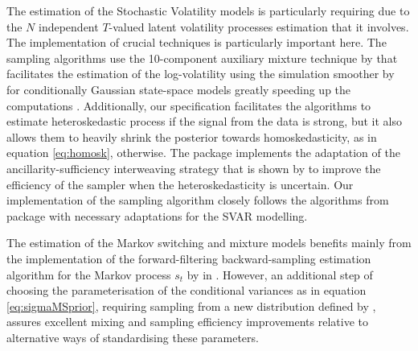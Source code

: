 \documentclass[
  nojss]{jss}
\begin{document}
The estimation of the Stochastic Volatility models is particularly
requiring due to the \(N\) independent \(T\)-valued latent volatility
processes estimation that it involves. The implementation of crucial
techniques is particularly important here. The sampling algorithms use
the 10-component auxiliary mixture technique by \cite{Omori2007} that
facilitates the estimation of the log-volatility using the simulation
smoother by \cite{mccausland2011simulation} for conditionally Gaussian
state-space models greatly speeding up the computations
\citep[see][for the computational times comparison for various estimation algorithms]{twss_2021}.
Additionally, our specification facilitates the algorithms to estimate
heteroskedastic process if the signal from the data is strong, but it
also allows them to heavily shrink the posterior towards
homoskedasticity, as in equation \eqref{eq:homosk}, otherwise. The
package implements the adaptation of the ancillarity-sufficiency
interweaving strategy that is shown by \cite{Kastner2014} to improve the
efficiency of the sampler when the heteroskedasticity is uncertain. Our
implementation of the sampling algorithm closely follows the algorithms
from package  with necessary adaptations for the SVAR
modelling.

The estimation of the Markov switching and mixture models benefits
mainly from the implementation of the forward-filtering
backward-sampling estimation algorithm for the Markov process \(s_t\) by
\cite{Chib1996} in . However, an additional step of
choosing the parameterisation of the conditional variances as in
equation \eqref{eq:sigmaMSprior}, requiring sampling from a new
distribution defined by \cite{Wozniak2015}, assures excellent mixing and
sampling efficiency improvements relative to alternative ways of
standardising these parameters.
\end{document}
